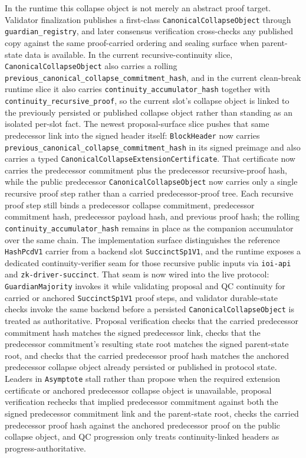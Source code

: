 \documentclass[11pt]{article}
\newcommand{\code}[1]{\texttt{#1}}
\begin{document}
In the runtime this collapse object is not merely an abstract proof
target. Validator finalization publishes a first-class
\code{CanonicalCollapseObject} through \code{guardian\_registry}, and later
consensus verification cross-checks any published copy against the same
proof-carried ordering and sealing surface when parent-state data is available.
In the current recursive-continuity slice, \code{CanonicalCollapseObject}
also carries a rolling \code{previous\_canonical\_collapse\_commitment\_hash}, and in the
current clean-break runtime slice it also carries
\code{continuity\_accumulator\_hash} together with
\code{continuity\_recursive\_proof}, so the current slot's collapse object is
linked to the previously persisted or published collapse object rather than
standing as an isolated per-slot fact. The newest proposal-surface slice
pushes that same predecessor link into the signed header itself:
\code{BlockHeader} now carries
\code{previous\_canonical\_collapse\_commitment\_hash} in
its signed preimage and also carries a typed
\code{CanonicalCollapseExtensionCertificate}. That certificate now carries the
predecessor commitment plus the predecessor recursive-proof hash, while the
public predecessor \code{CanonicalCollapseObject} now carries only a single
recursive proof step rather than a carried predecessor-proof tree. Each
recursive proof step still binds a predecessor collapse commitment,
predecessor commitment hash, predecessor payload hash, and previous proof
hash; the rolling
\code{continuity\_accumulator\_hash} remains in place as the companion
accumulator over the same chain. The implementation surface
distinguishes the reference \code{HashPcdV1} carrier from a backend slot
\code{SuccinctSp1V1}, and the runtime exposes a dedicated continuity-verifier
seam for those recursive public inputs via \code{ioi-api} and
\code{zk-driver-succinct}. That seam is now wired into the live protocol:
\code{GuardianMajority} invokes it while validating proposal and QC continuity
for carried or anchored \code{SuccinctSp1V1} proof steps, and validator
durable-state checks invoke the same backend before a persisted
\code{CanonicalCollapseObject} is treated as authoritative. Proposal verification checks that the carried
predecessor commitment hash matches the signed predecessor link, checks that
the predecessor commitment's resulting state root matches the signed parent-state root, and
checks that the carried predecessor proof hash matches the anchored
predecessor collapse object already persisted or published in protocol state.
Leaders in
\code{Asymptote} stall rather than propose when the required extension
certificate or anchored predecessor collapse object is unavailable, proposal
verification rechecks that implied predecessor commitment against both the
signed predecessor commitment link and the parent-state root, checks the
carried predecessor proof hash against the anchored predecessor proof on the
public collapse object, and QC progression only treats continuity-linked headers as
progress-authoritative.
\end{document}

